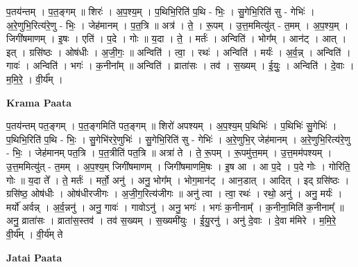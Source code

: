 \documentclass[17pt]{extarticle}
\begin{document}
प॒तय॑न्तम् । प॒त॒ङ्गम् ॥ शिरः॑ । अ॒प॒श्य॒म् । प॒थिभि॒रिति॑ प॒थि - भिः॒ । सु॒गेभि॒रिति॑ सु - गेभिः॑ । अ॒रे॒णुभि॒रित्य॑रे॒णु - भिः॒ । जेह॑मानम् । प॒त॒त्रि ॥ अत्र॑ । ते॒ । रू॒पम् । उ॒त्त॒ममित्यु॑त् - त॒मम् । अ॒प॒श्य॒म् । जिगी॑षमाणम् । इ॒षः । एति॑ । प॒दे । गोः ॥ य॒दा । ते॒ । मर्तः॑ । अन्विति॑ । भोग᳚म् । आन॑ट् । आत् । इत् । ग्रसि॑ष्ठः । ओष॑धीः । अ॒जी॒गः॒ ॥ अन्विति॑ । त्वा॒ । रथः॑ । अन्विति॑ । मर्यः॑ । अ॒र्व॒न्न् । अन्विति॑ । गावः॑ । अन्विति॑ । भगः॑ । क॒नीना᳚म् ॥ अन्विति॑ । व्राता॑सः । तव॑ । स॒ख्यम् । ई॒युः॒ । अन्विति॑ । दे॒वाः । म॒मि॒रे॒ । वी॒र्य᳚म् ।  \newline


\textbf{Krama Paata} \newline

प॒तय॑न्तम् पत॒ङ्गम् । प॒त॒ङ्गमिति॑ पत॒ङ्गम् ॥ शिरो॑ अपश्यम् । अ॒प॒श्य॒म् प॒थिभिः॑ । प॒थिभिः॑ सु॒गेभिः॑ । प॒थिभि॒रिति॑ प॒थि - भिः॒ । सु॒गेभि॑ररे॒णुभिः॑ । सु॒गेभि॒रिति॑ सु - गेभिः॑ । अ॒रे॒णुभि॒र् जेह॑मानम् । अ॒रे॒णुभि॒रित्य॑रे॒णु - भिः॒ । जेह॑मानम् पत॒त्रि । प॒त॒त्रीति॑ पत॒त्रि ॥ अत्रा॑ ते । ते॒ रू॒पम् । रू॒पमु॑त्त॒मम् । उ॒त्त॒मम॑पश्यम् । उ॒त्त॒ममित्यु॑त् - त॒मम् । अ॒प॒श्य॒म् जिगी॑षमाणम् । जिगी॑षमाणमि॒षः । इ॒ष आ । आ प॒दे । प॒दे गोः । गोरिति॒ गोः ॥ य॒दा ते᳚ । ते॒ मर्तः॑ । मर्तो॒ अनु॑ । अनु॒ भोग᳚म् । भोग॒मान॑ट् । आन॒डात् । आदित् । इद् ग्रसि॑ष्ठः । ग्रसि॑ष्ठ॒ ओष॑धीः । ओष॑धीरजीगः । अ॒जी॒ग॒रित्य॑जीगः ॥ अनु॑ त्वा । त्वा॒ रथः॑ । रथो॒ अनु॑ । अनु॒ मर्यः॑ । मर्यो॑ अर्वन्न् । अ॒र्व॒न्ननु॑ । अनु॒ गावः॑ । गावोऽनु॑ । अनु॒ भगः॑ । भगः॑ क॒नीनाम्᳚ । क॒नीना॒मिति॑ क॒नीनाम्᳚ ॥ अनु॒ व्राता॑सः । व्राता॑स॒स्तव॑ । तव॑ स॒ख्यम् । स॒ख्यमी॑युः । ई॒यु॒रनु॑ । अनु॑ दे॒वाः । दे॒वा म॑मिरे । म॒मि॒रे॒ वी॒र्य᳚म् । वी॒र्य॑म् ते \newline

\textbf{Jatai Paata} \newline
\end{document}
